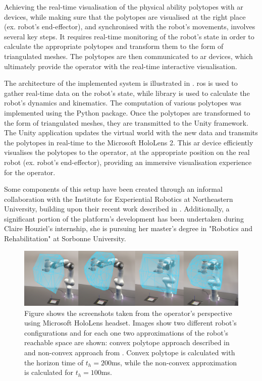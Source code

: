 Achieving the real-time visualisation of the physical ability polytopes with \gls{ar} devices, while making sure that the polytopes are visualised at the right place (ex. robot's end-effector), and synchronised with the robot's movements, involves several key steps. It requires real-time monitoring of the robot's state in order to calculate the appropriate polytopes and transform them to the form of triangulated meshes. The polytopes are then communicated to \gls{ar} devices, which ultimately provide the operator with the real-time interactive visualisation. 

The architecture of the implemented system is illustrated in . \gls{ros} is used to gather real-time data on the robot's state, while  \cite{pinocchio2021} library is used to calculate the robot's dynamics and kinematics. The computation of various polytopes was implemented using the  Python package. Once the polytopes are transformed to the form of triangulated meshes, they are transmitted to the Unity framework. The Unity application updates the virtual world with the new data and transmits the polytopes in real-time to the Microsoft HoloLens 2. This \gls{ar} device efficiently visualises the polytopes to the operator, at the appropriate position on the real robot (ex. robot's end-effector), providing an immersive visualisation experience for the operator.


Some components of this setup have been created through an informal collaboration with the Institute for Experiential Robotics at Northeastern University, building upon their recent work described in \citet{Zolotas2021}. Additionally, a significant portion of the platform's development has been undertaken during Claire Houziel's internship, she is pursuing her master's degree in "Robotics and Rehabilitation" at Sorbonne University.

\begin{figure}[!h]
    \centering
    \includegraphics[width=\linewidth]{Papers/images/HoleLens3.jpg}
    \caption{Figure shows the screenshots taken from the operator's perspective using Microsoft HoloLens headset. Images show two different robot's configurations and for each one two approximations of the robot's reachable space are shown: convex polytope approach described in  and non-convex approach from .  
    Convex polytope is calculated with the horizon time of $t_h=200$ms, while the non-convex approximation is calculated for $t_h=100$ms.}
    \label{fig:ar_images}
\end{figure}


